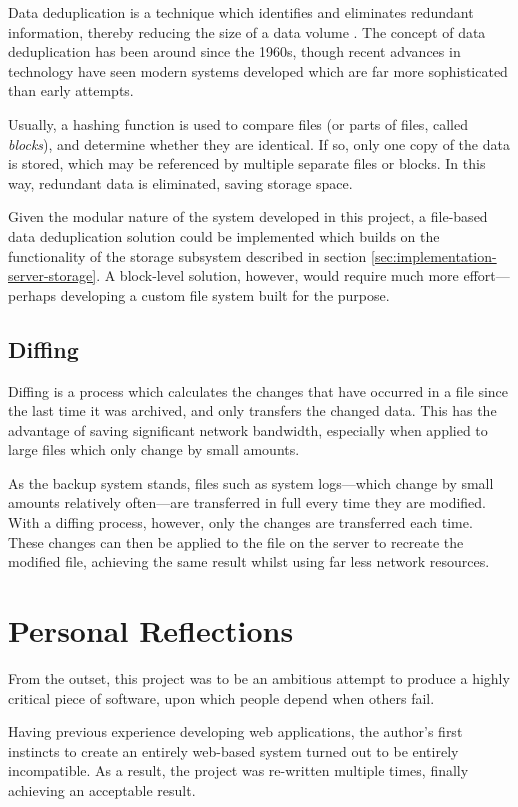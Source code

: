 Data deduplication is a technique which identifies and eliminates redundant
information, thereby reducing the size of a data volume \cite{geer2008}. The
concept of data deduplication has been around since the 1960s, though recent
advances in technology have seen modern systems developed which are far more
sophisticated than early attempts.

Usually, a hashing function is used to compare files (or parts of files, called
\emph{blocks}), and determine whether they are identical. If so, only one copy
of the data is stored, which may be referenced by multiple separate files or
blocks. In this way, redundant data is eliminated, saving storage space.

Given the modular nature of the system developed in this project, a file-based
data deduplication solution could be implemented which builds on the
functionality of the storage subsystem described in section
\ref{sec:implementation-server-storage}. A block-level solution, however, would
require much more effort---perhaps developing a custom file system built for
the purpose.

\subsection{Diffing}

Diffing is a process which calculates the changes that have occurred in a file
since the last time it was archived, and only transfers the changed data. This
has the advantage of saving significant network bandwidth, especially when
applied to large files which only change by small amounts.

As the backup system stands, files such as system logs---which change by small
amounts relatively often---are transferred in full every time they are
modified. With a diffing process, however, only the changes are transferred
each time. These changes can then be applied to the file on the server to
recreate the modified file, achieving the same result whilst using far less
network resources.

\section{Personal Reflections}

From the outset, this project was to be an ambitious attempt to produce
a highly critical piece of software, upon which people depend when others fail.

Having previous experience developing web applications, the author's first
instincts to create an entirely web-based system turned out to be entirely
incompatible. As a result, the project was re-written multiple times, finally
achieving an acceptable result.

